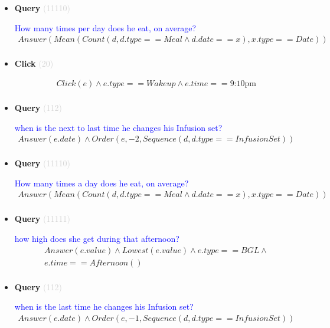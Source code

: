 \documentclass[11pt]{article}
\newcommand{\key}[1]{\textcolor{lightgray}{#1}}
\newcounter{CQuery}
\newcounter{CClick}
\begin{document}
\begin{itemize}
\item
\textbf{Query\theCQuery} \key{(11110)} \addtocounter{CQuery}{1}
\textcolor{blue}{ How many times per day does he eat, on average? }
\begin{multline*}
Answer(Mean(Count(d, d.type==Meal \wedge d.date==x), x.type==Date)) \\ 
\end{multline*}


\item
\textbf{Click\theCClick} \key{(20)} \addtocounter{CClick}{1}
\textcolor{blue}{  }
\begin{multline*}
Click(e) \wedge e.type==Wakeup \wedge e.time==\mbox{9:10pm} \\ 
\end{multline*}


\item
\textbf{Query\theCQuery} \key{(112)} \addtocounter{CQuery}{1}
\textcolor{blue}{ when is the next to last time he changes his Infusion set? }
\begin{multline*}
Answer(e.date) \wedge Order(e, -2, Sequence(d, d.type==InfusionSet)) \\ 
\end{multline*}


\item
\textbf{Query\theCQuery} \key{(11110)} \addtocounter{CQuery}{1}
\textcolor{blue}{ How many times a day does he eat, on average? }
\begin{multline*}
Answer(Mean(Count(d, d.type==Meal \wedge d.date==x), x.type==Date)) \\ 
\end{multline*}


\item
\textbf{Query\theCQuery} \key{(11111)} \addtocounter{CQuery}{1}
\textcolor{blue}{ how high does she get during that afternoon? }
\begin{multline*}
Answer(e.value) \wedge Lowest(e.value) \wedge e.type==BGL \wedge \\ 
e.time==Afternoon() \\ 
\end{multline*}


\item
\textbf{Query\theCQuery} \key{(112)} \addtocounter{CQuery}{1}
\textcolor{blue}{ when is the last time he changes his Infusion set? }
\begin{multline*}
Answer(e.date) \wedge Order(e, -1, Sequence(d, d.type==InfusionSet)) \\ 
\end{multline*}



\end{itemize}
\end{document}
